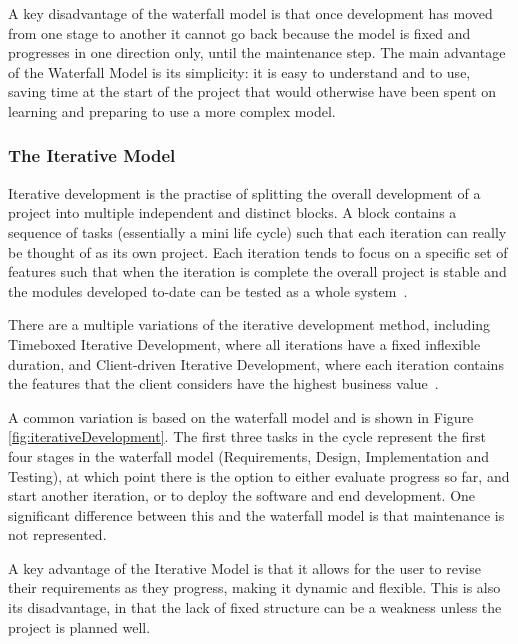 \documentclass{article}
\begin{document}
A key disadvantage of the waterfall model is that once development has moved from one stage to another it cannot go back because the model is fixed and progresses in one direction only, until the maintenance step.  The main advantage of the Waterfall Model is its simplicity: it is easy to understand and to use, saving time at the start of the project that would otherwise have been spent on learning and preparing to use a more complex model.

\subsubsection{The Iterative Model}
Iterative development is the practise of splitting the overall development of a project into multiple independent and distinct blocks.  A block contains a sequence of tasks (essentially a mini life cycle) such that each iteration can really be thought of as its own project.  Each iteration tends to focus on a specific set of features such that when the iteration is complete the overall project is stable and the modules developed to-date can be tested as a whole system~\cite{differenceBetweenLifeCycleModels}.

There are a multiple variations of the iterative development method, including Timeboxed Iterative Development, where all iterations have a fixed inflexible duration, and Client-driven Iterative Development, where each iteration contains the features that the client considers have the highest business value~\cite{larman2004agile}.

A common variation is based on the waterfall model and is shown in Figure \ref{fig:iterativeDevelopment}.  The first three tasks in the cycle represent the first four stages in the waterfall model (Requirements, Design, Implementation and Testing), at which point there is the option to either evaluate progress so far, and start another iteration, or to deploy the software and end development.  One significant difference between this and the waterfall model is that maintenance is not represented.

A key advantage of the Iterative Model is that it allows for the user to revise their requirements as they progress, making it dynamic and flexible.  This is also its disadvantage, in that the lack of fixed structure can be a weakness unless the project is planned well.
\end{document}
